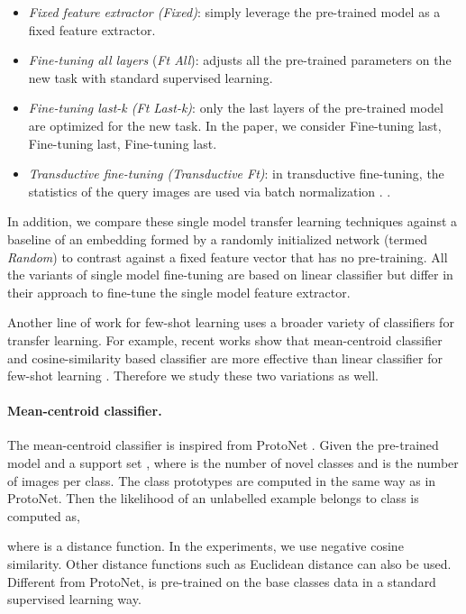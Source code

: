 \documentclass[runningheads]{llncs}
\begin{document}
\begin{itemize}
\item \textit{Fixed feature extractor (Fixed)}: simply leverage the pre-trained model as a fixed feature extractor. 
    
    \item \textit{Fine-tuning all layers} (\textit{Ft All}): adjusts all the pre-trained parameters on the new task with standard
    supervised learning. 
    
    \item \textit{Fine-tuning last\--k (Ft Last-k)}: only the last  layers of the pre-trained model are optimized for the new task. In the paper, we consider Fine-tuning last,  Fine-tuning last, Fine-tuning last.
    
    \item \textit{Transductive fine-tuning (Transductive Ft)}: in transductive fine-tuning, the statistics of the query images are used via batch normalization \cite{dhillonfsbaseline}.  \cite{nichol2018first}.
\end{itemize}

In addition, we compare these single model transfer learning techniques against a baseline of an embedding formed by a randomly initialized network (termed {\em Random}) to contrast against a fixed feature vector that has no pre-training. All the variants of single model fine-tuning are based on linear classifier but differ in their approach to fine-tune the single model feature extractor.

Another line of work for few-shot learning uses a broader variety of classifiers for transfer learning. For example, recent works show that mean-centroid classifier and cosine-similarity based classifier are more effective than linear classifier for few-shot learning \cite{mensink2013distance,chen2018a}. Therefore we study these two variations as well.

\paragraph{Mean-centroid classifier.}
The mean-centroid classifier is inspired from ProtoNet \cite{snell2017prototypical}. Given the pre-trained model  and a support set , where  is the number of novel classes and  is the number of images per class. The class prototypes are computed in the same way as in ProtoNet. Then the likelihood of an unlabelled example  belongs to class  is computed as,

where  is a distance function. In the experiments, we use negative cosine similarity. Other distance functions such as Euclidean distance can also be used. Different from ProtoNet,  is pre-trained on the base classes data in a standard supervised learning way.
\end{document}
